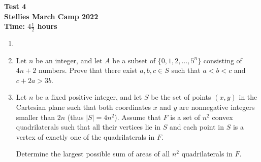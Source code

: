 \documentclass{article}
\begin{document}
\thispagestyle{empty}

\begin{center}
  \textbf{\Large Test 4}
  \\ \vspace{1em}
  \textbf{\large Stellies March Camp 2022}
  \\ \vspace{1em}
  \textbf{\large Time: $4\frac{1}{2}$ hours}
\end{center}

\vspace{24pt}

\begin{enumerate}[itemsep=12pt]

\item %


\item %
Let $n$ be an integer, and let $A$ be a subset of $\{0, 1, 2, \dotsc, 5^n\}$ consisting of $4n+2$ numbers.
Prove that there exist $a, b, c \in S$ such that $a < b < c$ and $c +2a > 3b$.

\item %
Let $n$ be a fixed positive integer, and let $S$ be the set of points $(x,y)$ in the Cartesian plane such that both coordinates $x$ and $y$ are nonnegative integers smaller than $2n$ (thus $|S| = 4n^2$).
Assume that $F$ is a set of $n^2$ convex quadrilaterals such that all their vertices lie in $S$ and each point in $S$ is a vertex of exactly one of the quadrilaterals in $F$.

Determine the largest possible sum of areas of all $n^2$ quadrilaterals in $F$.

\end{enumerate}

\vfill
\centering
\begin{BVerbatim}
\end{BVerbatim}
\end{document}
